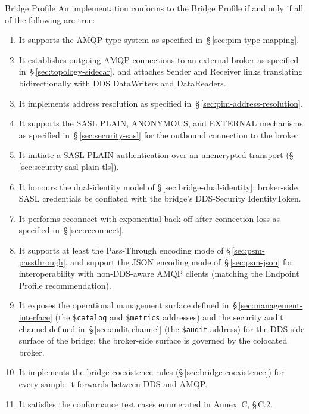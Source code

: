 \documentclass{../styles/zerodds-vendor-spec}
\begin{document}
\begin{conformance}{Bridge Profile}
An implementation conforms to the Bridge Profile if and only if all
of the following are true:
\begin{enumerate}
  \item It supports the AMQP type-system as specified
        in~\S\,\ref{sec:pim-type-mapping}.
  \item It establishes outgoing AMQP connections to an external
        broker as specified in~\S\,\ref{sec:topology-sidecar}, and
        attaches Sender and Receiver links translating
        bidirectionally with DDS DataWriters and DataReaders.
  \item It implements address resolution as specified
        in~\S\,\ref{sec:pim-address-resolution}.
  \item It supports the SASL PLAIN, ANONYMOUS, and EXTERNAL
        mechanisms as specified in~\S\,\ref{sec:security-sasl}
        for the outbound connection to the broker.
  \item It  initiate a SASL PLAIN authentication
        over an unencrypted transport
        (\S\,\ref{sec:security-sasl-plain-tls}).
  \item It honours the dual-identity model of
        \S\,\ref{sec:bridge-dual-identity}: broker-side
        SASL credentials  be conflated with the
        bridge's DDS-Security IdentityToken.
  \item It performs reconnect with exponential back-off after
        connection loss as specified in~\S\,\ref{sec:reconnect}.
  \item It supports at least the Pass-Through encoding mode of
        \S\,\ref{sec:psm-passthrough}, and  support
        the JSON encoding mode of~\S\,\ref{sec:psm-json} for
        interoperability with non-DDS-aware AMQP clients
        (matching the Endpoint Profile recommendation).
  \item It exposes the operational management surface defined
        in~\S\,\ref{sec:management-interface} (the
        \texttt{\$catalog} and \texttt{\$metrics} addresses) and
        the security audit channel defined
        in~\S\,\ref{sec:audit-channel} (the \texttt{\$audit}
        address) for the DDS-side surface of the bridge; the
        broker-side surface is governed by the colocated
        broker.
  \item It implements the bridge-coexistence rules
        (\S\,\ref{sec:bridge-coexistence}) for every sample it
        forwards between DDS and AMQP.
  \item It satisfies the conformance test cases enumerated in
        Annex~C, \S\,C.2.
\end{enumerate}
\end{conformance}
\end{document}
